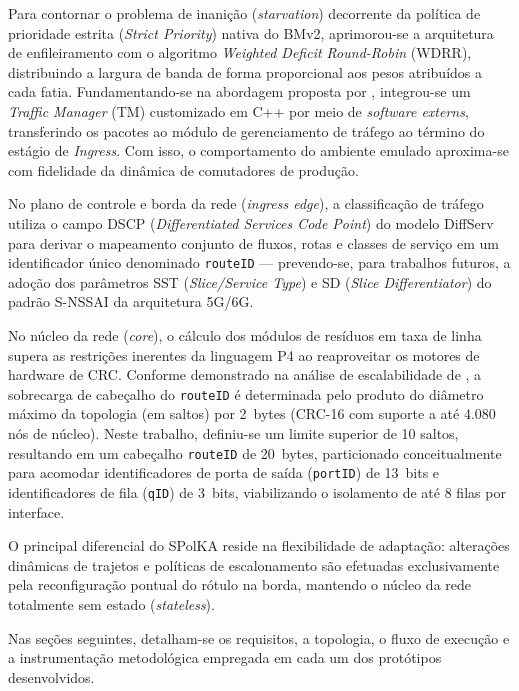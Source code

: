 Para contornar o problema de inanição (\textit{starvation}) decorrente da política de prioridade estrita (\textit{Strict Priority}) nativa do BMv2, aprimorou-se a arquitetura de enfileiramento com o algoritmo \textit{Weighted Deficit Round-Robin} (WDRR), distribuindo a largura de banda de forma proporcional aos pesos atribuídos a cada fatia. Fundamentando-se na abordagem proposta por \cite{Elbediwy2025}, integrou-se um \textit{Traffic Manager} (TM) customizado em C++ por meio de \textit{software externs}, transferindo os pacotes ao módulo de gerenciamento de tráfego ao término do estágio de \textit{Ingress}. Com isso, o comportamento do ambiente emulado aproxima-se com fidelidade da dinâmica de comutadores de produção.

No plano de controle e borda da rede (\textit{ingress edge}), a classificação de tráfego utiliza o campo DSCP (\textit{Differentiated Services Code Point}) do modelo DiffServ para derivar o mapeamento conjunto de fluxos, rotas e classes de serviço em um identificador único denominado \texttt{routeID} --- prevendo-se, para trabalhos futuros, a adoção dos parâmetros SST (\textit{Slice/Service Type}) e SD (\textit{Slice Differentiator}) do padrão S-NSSAI da arquitetura 5G/6G. 

No núcleo da rede (\textit{core}), o cálculo dos módulos de resíduos em taxa de linha supera as restrições inerentes da linguagem P4 ao reaproveitar os motores de hardware de CRC. Conforme demonstrado na análise de escalabilidade de \cite{dominicini2020}, a sobrecarga de cabeçalho do \texttt{routeID} é determinada pelo produto do diâmetro máximo da topologia (em saltos) por 2~bytes (CRC-16 com suporte a até 4.080 nós de núcleo). Neste trabalho, definiu-se um limite superior de 10 saltos, resultando em um cabeçalho \texttt{routeID} de 20~bytes, particionado conceitualmente para acomodar identificadores de porta de saída (\texttt{portID}) de 13~bits e identificadores de fila (\texttt{qID}) de 3~bits, viabilizando o isolamento de até 8 filas por interface.

O principal diferencial do SPolKA reside na flexibilidade de adaptação: alterações dinâmicas de trajetos e políticas de escalonamento são efetuadas exclusivamente pela reconfiguração pontual do rótulo na borda, mantendo o núcleo da rede totalmente sem estado (\textit{stateless}). 

Nas seções seguintes, detalham-se os requisitos, a topologia, o fluxo de execução e a instrumentação metodológica empregada em cada um dos protótipos desenvolvidos.


